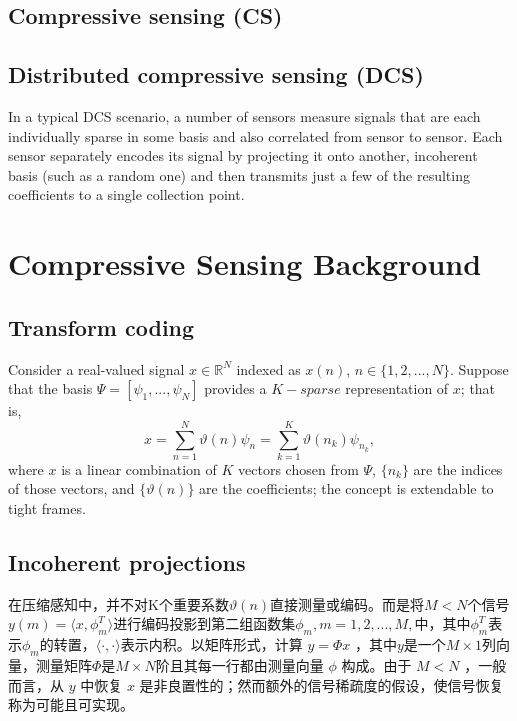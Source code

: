 \documentclass[UTF8]{ctexart}
\theoremstyle{plain}
\theoremstyle{definition}
\theoremstyle{remark}
\newcommand{\upcite}[1]{\textsuperscript{\textsuperscript{\cite{#1}}}}
\begin{document}
\subsection{Compressive sensing (CS)}

\subsection{Distributed compressive sensing (DCS)}
In a typical DCS scenario, a number of sensors measure signals that are each individually sparse in some basis and also correlated from sensor to sensor. Each sensor separately encodes its signal by projecting it onto another, incoherent basis (such as a random one) and then transmits just a few of the resulting coefficients to a single collection point.

\section{Compressive Sensing Background}

\subsection{Transform coding}

Consider a real-valued signal $x\in \mathbb{R}^N$ indexed as $x(n)$, $n \in \{1,2,...,N\}$. Suppose that the basis $\Psi = [\psi_1,...,\psi_N]$ provides a $K-sparse$ representation of $x$; that is,
\begin{equation}
	x = \sum_{n=1}^{N} \vartheta (n) \psi_n = \sum_{k=1}^{K} \vartheta (n_k) \psi_{n_k},
	\label{eq1}
\end{equation}
where $x$ is a linear combination of $K$ vectors chosen from $\Psi$, $\{n_k\}$ are the indices of those vectors, and $\{\vartheta(n)\}$ are the coefficients; the concept is extendable to tight frames\upcite{1}.

\subsection{Incoherent projections}
在压缩感知中，并不对K个重要系数$\vartheta(n)$直接测量或编码。而是将$M<N$个信号$y(m) = \langle x, \phi_m^T \rangle$进行编码投影到第二组函数集$\phi_m, m=1, 2,...,M,$中，其中$\phi_m^T$表示$\phi_m$的转置，$\langle \cdot, \cdot \rangle$表示内积。以矩阵形式，计算 $y=\Phi x$ ，其中$y$是一个$M \times 1$列向量，测量矩阵$\Phi$是$M\times N$阶且其每一行都由测量向量 $\phi$ 构成。由于 $M<N$ ，一般而言，从 $y$ 中恢复 $x$ 是非良置性的；然而额外的信号稀疏度的假设，使信号恢复称为可能且可实现。
\end{document}
